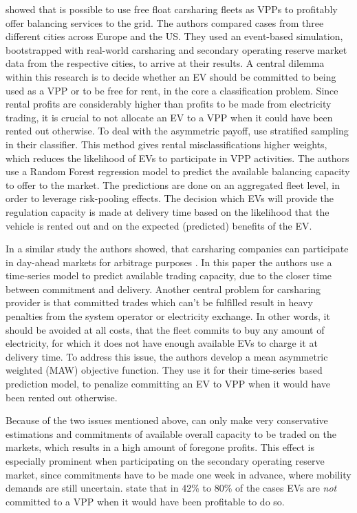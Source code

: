 \documentclass[12pt, article]{article}
\begin{document}
\textcite{kahlen17_fleet} showed that is possible to use free float carsharing
fleets as VPPs to profitably offer balancing services to the grid. The authors
compared cases from three different cities across Europe and the US.
They used an event-based simulation, bootstrapped with real-world carsharing
and secondary operating reserve market data from the respective cities, to
arrive at their results. A central dilemma within this research is to decide
whether an EV should be committed to being used as a VPP or to be free for
rent, in the core a classification problem. Since rental profits are
considerably higher than profits to be made from electricity trading, it is
crucial to not allocate an EV to a VPP when it could have been rented out
otherwise. To deal with the asymmetric payoff, \citeauthor{kahlen17_fleet} use
stratified sampling in their classifier. This method gives rental
misclassifications higher weights, which reduces the likelihood of EVs to
participate in VPP activities. The authors use a Random Forest regression model
to predict the available balancing capacity to offer to the market. The
predictions are done on an aggregated fleet level, in order to leverage
risk-pooling effects. The decision which EVs will provide the regulation
capacity is made at delivery time based on the likelihood that the vehicle is
rented out and on the expected (predicted) benefits of the EV.

In a similar study the authors showed, that carsharing companies can
participate in day-ahead markets for arbitrage purposes
\parencite{kahlen18_elect_vehic_virtual_power_plant_dilem}. In this paper the authors
use a time-series model to predict available trading capacity, due to the closer
time between commitment and delivery. Another central problem for carsharing
provider is that committed trades which can't be fulfilled result in heavy
penalties from the system operator or electricity exchange. In other words, it
should be avoided at all costs, that the fleet commits to buy any amount of
electricity, for which it does not have enough available EVs to charge it at
delivery time. To address this issue, the authors develop a mean asymmetric
weighted (MAW) objective function. They use it for their time-series based
prediction model, to penalize committing an EV to VPP when it would have been
rented out otherwise.

Because of the two issues mentioned above,
\textcite{kahlen18_elect_vehic_virtual_power_plant_dilem} can only make very
conservative estimations and commitments of available overall capacity to be
traded on the markets, which results in a high amount of foregone profits. This
effect is especially prominent when participating on the secondary operating
reserve market, since commitments have to be made one week in advance, where
mobility demands are still uncertain.
\textcite{kahlen17_fleet} state that in 42\% to 80\% of the cases EVs are \emph{not}
committed to a VPP when it would have been profitable to do so.
\end{document}
